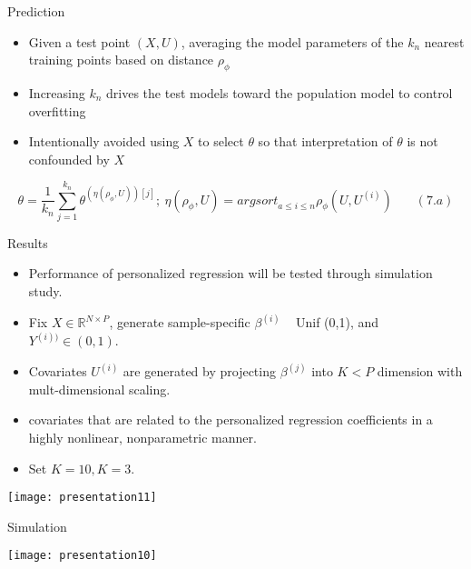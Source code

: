\documentclass[
  10pt,
  ignorenonframetext,
]{beamer}
\begin{document}
\begin{frame}{Prediction}
\protect\hypertarget{prediction}{}
\begin{itemize}
\item
  Given a test point \((X, U)\), averaging the model parameters of the
  \(k_n\) nearest training points based on distance \(\rho_\phi\)
\item
  Increasing \(k_n\) drives the test models toward the population model
  to control overfitting
\item
  Intentionally avoided using \(X\) to select \(\theta\) so that
  interpretation of \(\theta\) is not confounded by \(X\)
\end{itemize}

\[
\theta = \frac 1 {k_n} \sum^{k_n}_{j=1} \theta^{(\eta(\rho_\phi, U))[j]}; \ \eta(\rho_\phi, U) = {{argsort} _{a\leq i \leq n}} \rho_\phi (U, U^{(i)}) \ \ \ \ \ \ \ \ (7.a)
\]
\end{frame}

\begin{frame}{Results}
\protect\hypertarget{results}{}
\begin{itemize}
\item Performance of personalized regression will be tested through simulation study.
\item Fix $X \in \mathbb{R}^{N \times P}$, generate sample-specific $\beta^{(i)}$ ~ Unif (0,1), and $Y^{(i))} \in (0,1)$.
\item Covariates $U^{(i)}$ are generated by projecting $\beta^{(j)}$ into $K < P$ dimension with mult-dimensional scaling.
\item covariates that are related to the personalized regression coefficients in a highly nonlinear, nonparametric manner.
\item Set $K = 10, K = 3$.
\end{itemize}

\begin{center}\texttt{[image: presentation11]} \end{center}
\end{frame}

\begin{frame}{Simulation}
\protect\hypertarget{simulation}{}
\begin{center}\texttt{[image: presentation10]} \end{center}
\end{frame}
\end{document}
